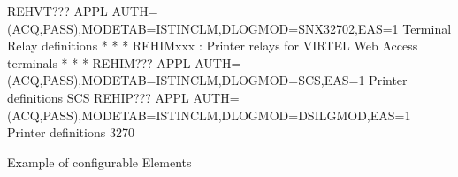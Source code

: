 \documentclass[letterpaper,10pt,english]{sphinxmanual}
\begin{document}
\begin{sphinxVerbatim}[commandchars=\\\{\}]
REHVT??? APPL  AUTH=(ACQ,PASS),MODETAB=ISTINCLM,DLOGMOD=SNX32702,EAS=1          \PYGZlt{}\PYGZhy{}\PYGZhy{}\PYGZhy{}\PYGZhy{} Terminal  Relay definitions
* \PYGZhy{}\PYGZhy{}\PYGZhy{}\PYGZhy{}\PYGZhy{}\PYGZhy{}\PYGZhy{}\PYGZhy{}\PYGZhy{}\PYGZhy{}\PYGZhy{}\PYGZhy{}\PYGZhy{}\PYGZhy{}\PYGZhy{}\PYGZhy{}\PYGZhy{}\PYGZhy{}\PYGZhy{}\PYGZhy{}\PYGZhy{}\PYGZhy{}\PYGZhy{}\PYGZhy{}\PYGZhy{}\PYGZhy{}\PYGZhy{}\PYGZhy{}\PYGZhy{}\PYGZhy{}\PYGZhy{}\PYGZhy{}\PYGZhy{}\PYGZhy{}\PYGZhy{}\PYGZhy{}\PYGZhy{}\PYGZhy{}\PYGZhy{}\PYGZhy{}\PYGZhy{}\PYGZhy{}\PYGZhy{}\PYGZhy{}\PYGZhy{}\PYGZhy{}\PYGZhy{}\PYGZhy{}\PYGZhy{}\PYGZhy{}\PYGZhy{}\PYGZhy{}\PYGZhy{}\PYGZhy{}\PYGZhy{}\PYGZhy{}\PYGZhy{}\PYGZhy{}\PYGZhy{}\PYGZhy{}\PYGZhy{}\PYGZhy{}\PYGZhy{}\PYGZhy{}\PYGZhy{}\PYGZhy{} *
* REHIMxxx    : Printer relays for VIRTEL Web Access terminals       *
* \PYGZhy{}\PYGZhy{}\PYGZhy{}\PYGZhy{}\PYGZhy{}\PYGZhy{}\PYGZhy{}\PYGZhy{}\PYGZhy{}\PYGZhy{}\PYGZhy{}\PYGZhy{}\PYGZhy{}\PYGZhy{}\PYGZhy{}\PYGZhy{}\PYGZhy{}\PYGZhy{}\PYGZhy{}\PYGZhy{}\PYGZhy{}\PYGZhy{}\PYGZhy{}\PYGZhy{}\PYGZhy{}\PYGZhy{}\PYGZhy{}\PYGZhy{}\PYGZhy{}\PYGZhy{}\PYGZhy{}\PYGZhy{}\PYGZhy{}\PYGZhy{}\PYGZhy{}\PYGZhy{}\PYGZhy{}\PYGZhy{}\PYGZhy{}\PYGZhy{}\PYGZhy{}\PYGZhy{}\PYGZhy{}\PYGZhy{}\PYGZhy{}\PYGZhy{}\PYGZhy{}\PYGZhy{}\PYGZhy{}\PYGZhy{}\PYGZhy{}\PYGZhy{}\PYGZhy{}\PYGZhy{}\PYGZhy{}\PYGZhy{}\PYGZhy{}\PYGZhy{}\PYGZhy{}\PYGZhy{}\PYGZhy{}\PYGZhy{}\PYGZhy{}\PYGZhy{}\PYGZhy{}\PYGZhy{} *
REHIM??? APPL  AUTH=(ACQ,PASS),MODETAB=ISTINCLM,DLOGMOD=SCS,EAS=1               \PYGZlt{}\PYGZhy{}\PYGZhy{}\PYGZhy{} Printer definitions SCS
REHIP??? APPL  AUTH=(ACQ,PASS),MODETAB=ISTINCLM,DLOGMOD=DSILGMOD,EAS=1          \PYGZlt{}\PYGZhy{}\PYGZhy{}\PYGZhy{} Printer definitions 3270
\end{sphinxVerbatim}

\newpage

\sphinxAtStartPar
Example of configurable Elements

\sphinxAtStartPar
{}

\newpage
\end{document}
